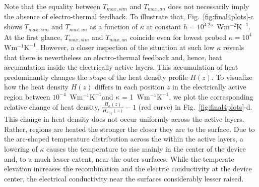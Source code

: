\documentclass[%
9pt,
 aip,
rsi,%
 amsmath,amssymb,
preprint,%
]{revtex4-1}
\newcommand{\thermalconductivity}{$\mathrm{W m^{-1} K^{-1}}$}
\newcommand{\hcoefficient}{$\mathrm{W m^{-2} K^{-1}}$}
\begin{document}
Note that the equality between $T_{max,sim}$ and $T_{max,an}$ does not necessarily imply the absence of electro-thermal feedback. 
To illustrate that, Fig.~\ref{fig:final4plots}-c shows $T_{max,sim}$ and $T_{max,an}$ as a function of $\kappa$ at constant $h = 10^{4.25}$~\hcoefficient. 
At the first glance, $T_{max,sim}$ and $T_{max,an}$ coincide even for lowest probed $\kappa = 10^4$~\thermalconductivity.
However, a closer inspection of the situation at such low $\kappa$ reveals that there is nevertheless an electro-thermal feedback and, hence, heat accumulation inside the electrically active layers.
This accumulation of heat predominantly changes the \textit{shape} of the heat density profile $H(z)$.
To visualize how the heat density $H(z)$ differs in each position $z$ in the electrically active region between $10^{-4}$~\thermalconductivity and $\kappa$ = 1~\thermalconductivity, we plot the corresponding relative change of heat density, $\frac{H_{\kappa}(z)}{H_{\kappa_{ref}}(z)}-1$ (red curve) in Fig.~\ref{fig:final4plots}-d.
%
This change in heat density does not occur uniformly across the active layers. 
Rather, regions are heated the stronger the closer they are to the surface.
Due to the arc-shaped temperature distribution across the within the active layers, a lowering of $\kappa$ causes the temperature to rise mainly in the center of the device and, to a much lesser extent, near the outer surfaces. 
While the temperate elevation increases the recombination and the electric conductivity at the device center, the electrical conductivity near the surfaces considerably lesser raised.
\end{document}
